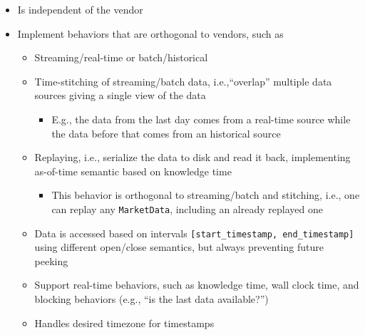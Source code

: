 \documentclass[11pt, reqno]{amsart}
\theoremstyle{definition}
\theoremstyle{remark}
\begin{document}
  \begin{itemize}
    \item Is independent of the vendor

    \item Implement behaviors that are orthogonal to vendors, such as

      \begin{itemize}
        \item Streaming/real-time or batch/historical

        \item Time-stitching of streaming/batch data, i.e.,``overlap'' multiple data
          sources giving a single view of the data

          \begin{itemize}
            \item E.g., the data from the last day comes from a real-time source
              while the data before that comes from an historical source
          \end{itemize}

        \item Replaying, i.e., serialize the data to disk and read it back, implementing
          as-of-time semantic based on knowledge time

          \begin{itemize}
            \item This behavior is orthogonal to streaming/batch and stitching,
              i.e., one can replay any \verb|MarketData|, including an already replayed
              one
          \end{itemize}

        \item Data is accessed based on intervals \verb|[start_timestamp, end_timestamp]|
          using different open/close semantics, but always preventing future
          peeking

        \item Support real-time behaviors, such as knowledge time, wall clock time,
          and blocking behaviors (e.g., ``is the last data available?'')

        \item Handles desired timezone for timestamps
      \end{itemize}
  \end{itemize}

\end{document}
